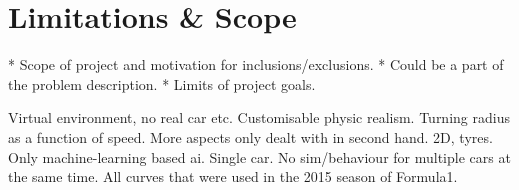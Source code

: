 \chapter{Limitations \& Scope}
  * Scope of project and motivation for inclusions/exclusions.
  * Could be a part of the problem description.
  * Limits of project goals. 
  



Virtual environment, no real car etc. Customisable physic realism.
  Turning radius as a function of speed. More aspects only dealt with in second hand. 2D, tyres.
Only machine-learning based ai.
Single car. No sim/behaviour for multiple cars at the same time. 
All curves that were used in the 2015 season of Formula1.